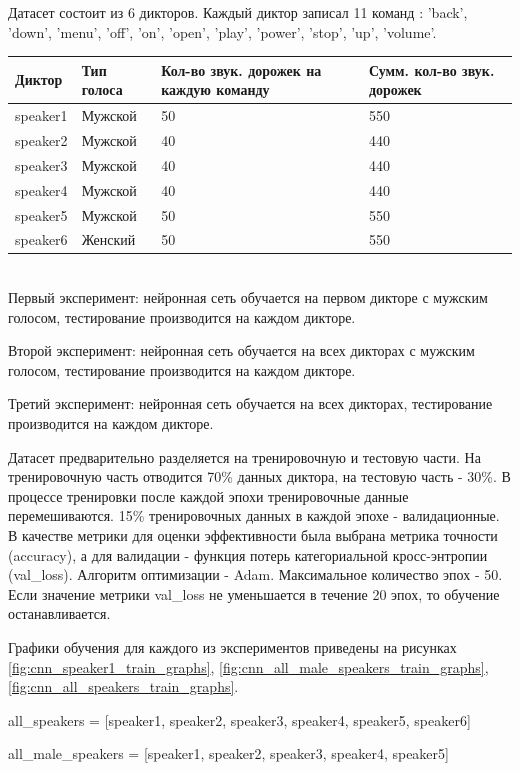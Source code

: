 \documentclass[14pt]{article}
\begin{document}
Датасет состоит из 6 дикторов. Каждый диктор записал 11 команд : 'back', 'down', 'menu', 'off', 'on', 'open', 'play', 'power', 'stop', 'up', 'volume'.
\\

\begin{tabular}[c]{ | p{2cm} | p{2cm} | p{6cm} | p{4cm} | }
\hline
Диктор & Тип голоса & Кол-во звук. дорожек на каждую команду & Сумм. кол-во звук. дорожек  \\ \hline
speaker1 & Мужской & 50 & 550 \\
speaker2 & Мужской & 40 & 440 \\
speaker3 & Мужской & 40 & 440 \\
speaker4 & Мужской & 40 & 440 \\
speaker5 & Мужской & 50 & 550 \\
speaker6 & Женский & 50 & 550 \\ \hline
\end{tabular}
\\

Первый эксперимент: нейронная сеть обучается на первом дикторе с мужским голосом, тестирование производится на каждом дикторе. 

Второй эксперимент: нейронная сеть обучается на всех дикторах с мужским голосом, тестирование производится на каждом дикторе. 

Третий эксперимент: нейронная сеть обучается на всех дикторах, тестирование производится на каждом дикторе.

Датасет предварительно разделяется на тренировочную и тестовую части. На тренировочную часть отводится 70\% данных диктора, на тестовую часть - 30\%. В процессе тренировки после каждой эпохи тренировочные данные перемешиваются. 15\% тренировочных данных в каждой эпохе - валидационные. В качестве метрики для оценки эффективности была выбрана метрика точности (accuracy), а для валидации - функция потерь категориальной кросс-энтропии (val\_loss). Алгоритм оптимизации - Adam. Максимальное количество эпох - 50. Если значение метрики val\_loss не уменьшается в течение 20 эпох, то обучение останавливается.

Графики обучения для каждого из экспериментов приведены на рисунках \ref{fig:cnn_speaker1_train_graphs}, \ref{fig:cnn_all_male_speakers_train_graphs}, \ref{fig:cnn_all_speakers_train_graphs}.

all\_speakers = [speaker1, speaker2, speaker3, speaker4, speaker5, speaker6]

all\_male\_speakers = [speaker1, speaker2, speaker3, speaker4, speaker5]
\end{document}
